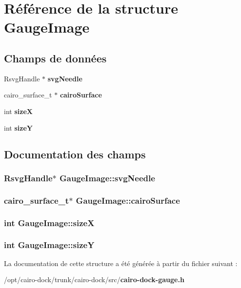 \section{Référence de la structure GaugeImage}
\label{structGaugeImage}
\subsection*{Champs de données}
\begin{CompactItemize}
\item 
RsvgHandle $\ast$ {\bf svgNeedle}
\item 
cairo\_\-surface\_\-t $\ast$ {\bf cairoSurface}
\item 
int {\bf sizeX}
\item 
int {\bf sizeY}
\end{CompactItemize}


\subsection{Documentation des champs}
\subsubsection{\setlength{\rightskip}{0pt plus 5cm}RsvgHandle$\ast$ {\bf GaugeImage::svgNeedle}}\label{structGaugeImage_e21f9c78997698e8d5a7c563a19d0667}


\subsubsection{\setlength{\rightskip}{0pt plus 5cm}cairo\_\-surface\_\-t$\ast$ {\bf GaugeImage::cairoSurface}}\label{structGaugeImage_59e6e21003945bcae1cdf7c20cb20c7e}


\subsubsection{\setlength{\rightskip}{0pt plus 5cm}int {\bf GaugeImage::sizeX}}\label{structGaugeImage_a7263dffc6e8097bed37ccea562645bf}


\subsubsection{\setlength{\rightskip}{0pt plus 5cm}int {\bf GaugeImage::sizeY}}\label{structGaugeImage_b1b3457ef14dc3a7faee6fa5c76d5acc}




La documentation de cette structure a été générée à partir du fichier suivant :\begin{CompactItemize}
\item 
/opt/cairo-dock/trunk/cairo-dock/src/{\bf cairo-dock-gauge.h}\end{CompactItemize}
